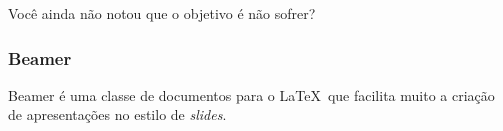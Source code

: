 \documentclass[aspectratio=43,14pt]{beamer}
\begin{document}
\begin{frame}
\end{frame}

\begin{frame}
    \Huge Você ainda não notou que o objetivo é não sofrer?
\end{frame}

\begin{frame}
    \frametitle{Beamer}
    Beamer é uma classe de documentos para o \LaTeX\ que facilita muito
    a criação de apresentações no estilo de \emph{slides}.
\end{frame}
\end{document}
